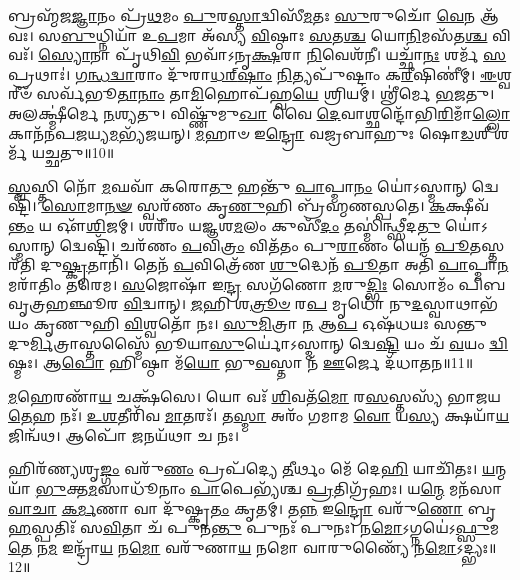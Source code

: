 𑌬𑍍𑌰𑌹𑍍𑌮᳴𑌜\-\ul{𑌜𑍍𑌞𑌾}\-𑌨𑌂 𑌪𑍍𑌰᳴\-\ul{𑌥}\-𑌮𑌂 \ul{𑌪𑍁}\-𑌰\-\ul{𑌸𑍍𑌤𑌾}\-𑌦𑍍𑌵𑌿𑌸𑍀᳴\-\ul{𑌮}\-𑌤𑌃 \ul{𑌸𑍁}\-𑌰𑍁𑌚𑍋᳴ \ul{𑌵𑍇}\-𑌨 𑌆᳴𑌵𑌃। 
𑌸\-\ul{𑌬𑍁}\-𑌧𑍍𑌨𑌿𑌯𑌾᳴ 𑌉\-\ul{𑌪}\-𑌮𑌾 𑌅᳴𑌸𑍍𑌯 \ul{𑌵𑌿}\-𑌷𑍍𑌠𑌾𑌃 \ul{𑌸}\-𑌤\-\ul{𑌶𑍍𑌚} 𑌯𑍋\-\ul{𑌨𑌿}\-𑌮𑌸᳴𑌤\-\ul{𑌶𑍍𑌚} 𑌵𑌿𑌵𑌃᳴। 
\-\ul{𑌸𑍍𑌯𑍋}\-𑌨𑌾 𑌪𑍃᳴𑌥𑌿\-\ul{𑌵𑌿} 𑌭𑌵𑌾᳴𑌽𑌨𑍃\-\ul{𑌕𑍍𑌷}\-𑌰𑌾 \ul{𑌨𑌿}\-𑌵𑍇𑌶᳴𑌨𑍀। 
𑌯𑌚𑍍𑌛𑌾᳴\-\ul{𑌨𑌃} 𑌶𑌰𑍍𑌮᳴ \ul{𑌸}\-𑌪𑍍𑌰𑌥𑌾𑌃॑। 
\-\ul{𑌗}\-\-\ul{𑌨𑍍𑌧}\-\-\ul{𑌦𑍍𑌵𑌾}\-𑌰𑌾𑌂 𑌦𑍁᳴𑌰𑌾\-\ul{𑌧}\-\-\ul{𑌰𑍍}\-‌\-\ul{𑌷𑌾𑌂} \ul{𑌨𑌿}\-𑌤𑍍𑌯𑌪𑍁᳴𑌷𑍍𑌟𑌾𑌂 𑌕\-\ul{𑌰𑍀}\-𑌷𑌿𑌣𑍀॑𑌮𑍍। 
\-\ul{𑌈}\-𑌶𑍍𑌵𑌰𑍀𑍞᳴ 𑌸𑌰𑍍𑌵᳴𑌭𑍂\-\ul{𑌤𑌾}\-\-\ul{𑌨𑌾𑌂} 𑌤𑌾\-\ul{𑌮𑌿}\-𑌹𑍋𑌪᳴𑌹𑍍𑌵\-\ul{𑌯𑍇} 𑌶𑍍𑌰𑌿𑌯𑌮𑍍। 
𑌶𑍍𑌰𑍀॑𑌰𑍍𑌮𑍇 \ul{𑌭}\-𑌜𑌤𑍁। 
𑌅𑌲𑌕𑍍𑌷𑍍𑌮𑍀॑𑌰𑍍𑌮𑍇 \ul{𑌨}\-𑌶𑍍𑌯𑌤𑍁। 
𑌵𑌿𑌷𑍍𑌣𑍁᳴𑌮𑍁\-\ul{𑌖𑌾} 𑌵𑍈 \ul{𑌦𑍇}\-𑌵𑌾𑌶𑍍𑌛𑌨𑍍𑌦𑍋᳴𑌭𑌿\-\ul{𑌰𑌿}\-𑌮𑌾𑌁\-\ul{𑌲𑍍𑌲𑍋}\-𑌕𑌾𑌨᳴𑌨𑌪\-\-\ul{𑌜}\-𑌯𑍍𑌯\-\ul{𑌮}\-𑌭𑍍𑌯᳴𑌜𑌯𑌨𑍍। 
\-\ul{𑌮}\-𑌹𑌾𑍞 𑌇\-\ul{𑌨𑍍𑌦𑍍𑌰𑍋} 𑌵𑌜𑍍𑌰𑌬𑌾𑌹𑍁𑌃 𑌷𑍋\-\ul{𑌡}\-𑌶𑍀 𑌶𑌰𑍍𑌮᳴ 𑌯𑌚𑍍𑌛𑌤𑍁॥10॥

 \ul{𑌸𑍍𑌵}\-𑌸𑍍𑌤𑌿 𑌨𑍋᳴ \ul{𑌮}\-𑌘𑌵𑌾᳴ 𑌕𑌰𑍋\-\ul{𑌤𑍁} 𑌹𑌨𑍍𑌤𑍁᳴ \ul{𑌪𑌾}\-𑌪𑍍𑌮𑌾\-\ul{𑌨𑌂} 𑌯𑍋॑𑌽𑌸𑍍𑌮𑌾𑌨𑍍 𑌦𑍍𑌵𑍇𑌷𑍍𑌟𑌿᳴। 
 \ul{𑌸𑍋}\-𑌮𑌾\-\ul{𑌨}\-\-\ul{𑍟} 𑌸𑍍𑌵𑌰᳴𑌣𑌂 𑌕𑍃\-\ul{𑌣𑍁}\-𑌹𑌿 𑌬𑍍𑌰᳴𑌹𑍍𑌮𑌣𑌸𑍍𑌪𑌤𑍇। 
 \ul{𑌕}\-𑌕𑍍𑌷𑍀𑌵᳴\-\ul{𑌨𑍍𑌤𑌂} 𑌯 𑌔᳴\-\ul{𑌶𑌿}\-𑌜𑌮𑍍। 
 𑌶𑌰𑍀᳴𑌰𑌂 𑌯𑌜𑍍𑌞𑌶\-\ul{𑌮}\-𑌲𑌂 𑌕𑍁𑌸𑍀᳴\-\ul{𑌦𑌂} 𑌤𑌸𑍍𑌮𑌿॑𑌨𑍍𑌥𑍍𑌸𑍀𑌦\-\ul{𑌤𑍁} 𑌯𑍋॑𑌽𑌸𑍍𑌮𑌾𑌨𑍍 𑌦𑍍𑌵𑍇𑌷𑍍𑌟𑌿᳴। 
 𑌚𑌰᳴𑌣𑌂 \ul{𑌪}\-𑌵𑌿\-\ul{𑌤𑍍𑌰𑌂} 𑌵𑌿𑌤᳴𑌤𑌂 𑌪𑍁\-\ul{𑌰𑌾}\-𑌣𑌂 𑌯𑍇𑌨᳴ \ul{𑌪𑍂}\-𑌤𑌸𑍍𑌤𑌰᳴𑌤𑌿 𑌦𑍁\-\ul{𑌷𑍍𑌕𑍃}\-𑌤𑌾𑌨𑌿᳴। 
 𑌤𑍇𑌨᳴ \ul{𑌪}\-𑌵𑌿𑌤𑍍𑌰𑍇᳴𑌣 \ul{𑌶𑍁}\-𑌦𑍍𑌧𑍇𑌨᳴ \ul{𑌪𑍂}\-𑌤𑌾 𑌅𑌤𑌿᳴ \ul{𑌪𑌾}\-𑌪𑍍𑌮𑌾\-\ul{𑌨}\-𑌮𑌰𑌾᳴𑌤𑌿𑌂 𑌤𑌰𑍇𑌮। 
 \ul{𑌸}\-𑌜𑍋𑌷𑌾᳴ 𑌇\-\ul{𑌨𑍍𑌦𑍍𑌰} 𑌸𑌗᳴𑌣𑍋 \ul{𑌮}\-𑌰𑍁\-\ul{𑌦𑍍𑌭𑌿𑌃} 𑌸𑍋𑌮𑌂᳴ 𑌪𑌿𑌬 𑌵𑍃𑌤𑍍𑌰𑌹𑌞𑍍𑌛𑍂𑌰 \ul{𑌵𑌿}\-𑌦𑍍𑌵𑌾𑌨𑍍। 
 \ul{𑌜}\-𑌹𑌿 𑌶\-\ul{𑌤𑍍𑌰𑍂}\-\-\ul{𑍞} 𑌰\-\ul{𑌪} 𑌮𑍃𑌧𑍋᳴ 𑌨𑍁\-\ul{𑌦}\-𑌸𑍍𑌵𑌾𑌥𑌾𑌭᳴𑌯𑌂 𑌕𑍃𑌣𑍁𑌹𑌿 \ul{𑌵𑌿}\-𑌶𑍍𑌵𑌤𑍋᳴ 𑌨𑌃। 
 \ul{𑌸𑍁}\-\-\ul{𑌮𑌿}\-𑌤𑍍𑌰𑌾 \ul{𑌨} 𑌆\-\ul{𑌪} 𑌓𑌷᳴𑌧𑌯𑌃 𑌸𑌨𑍍𑌤𑍁 𑌦𑍁\-\ul{𑌰𑍍𑌮𑌿}\-𑌤𑍍𑌰𑌾𑌸𑍍𑌤𑌸𑍍𑌮𑍈᳴ 𑌭𑍂𑌯𑌾\-\ul{𑌸𑍁}\-𑌰𑍍𑌯𑍋॑𑌽𑌸𑍍𑌮𑌾𑌨𑍍 𑌦𑍍𑌵𑍇\-\ul{𑌷𑍍𑌟𑌿} 𑌯𑌂 𑌚᳴ \ul{𑌵}\-𑌯𑌂 \ul{𑌦𑍍𑌵𑌿}\-𑌷𑍍𑌮𑌃। 
 𑌆\-\ul{𑌪𑍋} 𑌹𑌿 𑌷𑍍𑌠𑌾 𑌮᳴\-\ul{𑌯𑍋} 𑌭𑍁\-\ul{𑌵}\-𑌸𑍍𑌤𑌾 𑌨᳴ \ul{𑌊}\-𑌰𑍍𑌜𑍇 𑌦᳴𑌧𑌾𑌤𑌨॥11॥
 
 \ul{𑌮}\-𑌹𑍇𑌰𑌣𑌾᳴\-\ul{𑌯} 𑌚𑌕𑍍𑌷᳴𑌸𑍇। 
 𑌯𑍋 𑌵𑌃᳴ \ul{𑌶𑌿}\-𑌵𑌤᳴\-\ul{𑌮𑍋} 𑌰\-\ul{𑌸}\-𑌸𑍍𑌤𑌸𑍍𑌯᳴ 𑌭𑌾𑌜𑌯\-\ul{𑌤𑍇}\-𑌹 𑌨𑌃᳴। 
 \ul{𑌉}\-\-\ul{𑌶}\-𑌤𑍀𑌰𑌿᳴𑌵 \ul{𑌮𑌾}\-𑌤𑌰𑌃᳴। 
 𑌤\-\ul{𑌸𑍍𑌮𑌾} 𑌅𑌰𑌂᳴ 𑌗𑌮𑌾𑌮 \ul{𑌵𑍋} 𑌯\-\ul{𑌸𑍍𑌯} 𑌕𑍍𑌷𑌯𑌾᳴\-\ul{𑌯} 𑌜𑌿𑌨𑍍𑌵᳴𑌥। 
 𑌆𑌪𑍋᳴ \ul{𑌜}\-𑌨𑌯᳴𑌥𑌾 𑌚 𑌨𑌃।

 
𑌹𑌿𑌰᳴𑌣𑍍𑌯𑌶𑍃\-\ul{𑌙𑍍𑌗𑌂} 𑌵𑌰𑍁᳴\-\ul{𑌣𑌂} 𑌪𑍍𑌰𑌪᳴𑌦𑍍𑌯𑍇 \ul{𑌤𑍀}\-𑌰𑍍𑌥𑌂 𑌮𑍇᳴ 𑌦𑍇\-\ul{𑌹𑌿} 𑌯𑌾𑌚𑌿᳴𑌤𑌃। 
\-\ul{𑌯}\-𑌨𑍍𑌮𑌯𑌾᳴ \ul{𑌭𑍁}\-𑌕𑍍𑌤\-\ul{𑌮}\-𑌸𑌾𑌧𑍂᳴𑌨𑌾𑌂 \ul{𑌪𑌾}\-𑌪𑍇𑌭𑍍𑌯᳴𑌶𑍍𑌚 \ul{𑌪𑍍𑌰}\-𑌤𑌿𑌗𑍍𑌰᳴𑌹𑌃। 
𑌯\-\ul{𑌨𑍍𑌮𑍇} 𑌮𑌨᳴𑌸𑌾 \ul{𑌵𑌾}\-\-\ul{𑌚𑌾} \ul{𑌕}\-\-\ul{𑌰𑍍𑌮}\-𑌣𑌾 𑌵𑌾 𑌦𑍁᳴𑌷𑍍𑌕𑍃\-\ul{𑌤𑌂} 𑌕𑍃𑌤𑌮𑍍। 
𑌤\-\ul{𑌨𑍍𑌨} 𑌇\-\ul{𑌨𑍍𑌦𑍍𑌰𑍋} 𑌵𑌰𑍁᳴\-\ul{𑌣𑍋} 𑌬𑍃\-\ul{𑌹}\-𑌸𑍍𑌪𑌤𑌿𑌃᳴ 𑌸\-\ul{𑌵𑌿}\-𑌤𑌾 𑌚᳴ 𑌪𑍁𑌨\-\ul{𑌨𑍍𑌤𑍁} 𑌪𑍁𑌨𑌃᳴ 𑌪𑍁𑌨𑌃। 
𑌨\-\ul{𑌮𑍋}\-𑌽𑌗𑍍𑌨𑌯𑍇॑𑌽\-\ul{𑌫𑍍𑌸𑍁}\-𑌮\-\ul{𑌤𑍇} 𑌨\-\ul{𑌮} 𑌇𑌨𑍍𑌦𑍍𑌰𑌾᳴\-\ul{𑌯} 𑌨\-\ul{𑌮𑍋} 𑌵𑌰𑍁᳴𑌣𑌾\-\ul{𑌯} 𑌨𑌮𑍋 𑌵𑌾𑌰𑍁𑌣𑍍𑌯𑍈᳴ 𑌨\-\ul{𑌮𑍋}\-𑌽𑌦𑍍𑌭𑍍𑌯𑌃॥12॥

